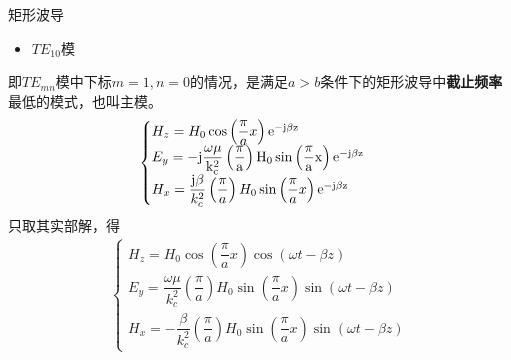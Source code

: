 \begin{frame}{矩形波导}
    \begin{itemize}
        \item $TE_{10}模$
    \end{itemize}
    即$TE_{mn}$模中下标$m=1,n=0$的情况，是满足$a>b$条件下的矩形波导中\textbf{截止频率}最低的模式，也叫主模。
    \begin{align*}
        \begin{cases}
            H_z=H_0\cos\left(\dfrac{\pi}{a}x\right)\rm{e}^{-\rm{j}\beta z}\\
            E_y=-\rm{j}\dfrac{\omega\mu}{k_c^2}\left(\dfrac{\pi}{a}\right)H_0\sin\left(\dfrac{\pi}{a}x\right)\rm{e}^{-\rm{j}\beta z}\\
            H_x=\dfrac{\rm{j}\beta}{k_c^2}\left(\dfrac{\pi}{a}\right)H_0\sin\left(\dfrac{\pi}{a}x\right)\rm{e}^{-\rm{j}\beta z}
        \end{cases}
    \end{align*}
    只取其实部解，得
    \begin{align*}
        \begin{cases}
            H_z=H_0\cos\left(\dfrac{\pi}{a}x\right)\cos(\omega t-\beta z)\\
            E_y=\dfrac{\omega\mu}{k_c^2}\left(\dfrac{\pi}{a}\right)H_0\sin\left(\dfrac{\pi}{a}x\right)\sin(\omega t-\beta z)\\
            H_x=-\dfrac{\beta}{k_c^2}\left(\dfrac{\pi}{a}\right)H_0\sin\left(\dfrac{\pi}{a}x\right)\sin(\omega t-\beta z)
        \end{cases}
    \end{align*}
\end{frame}

